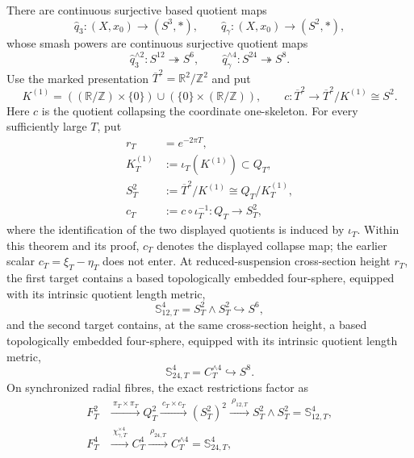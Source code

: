 \begin{theorem}
\label{cusp-cone-angle-forgotten-sphere-carriers}
There are continuous surjective based quotient maps
\[
 \widehat q_3:(X,x_0)\longrightarrow(S^3,*),
 \qquad
 \widehat q_\gamma:(X,x_0)\longrightarrow(S^2,*),
\]
whose smash powers are continuous surjective quotient maps
\begin{equation}
 \widehat q_3^{\wedge2}:S^{12}\twoheadrightarrow S^6,
 \qquad
 \widehat q_\gamma^{\wedge4}:S^{24}\twoheadrightarrow S^8.
 \label{cusp-cone-sphere-to-sphere-maps}
\end{equation}
Use the marked presentation \(\overline T^2=\mathbb R^2/\mathbb Z^2\) and
put
\[
 K^{(1)}
 =((\mathbb R/\mathbb Z)\times\{0\})
  \cup(\{0\}\times(\mathbb R/\mathbb Z)),
 \qquad
 c:\overline T^2\longrightarrow\overline T^2/K^{(1)}\cong S^2.
\]
Here \(c\) is the quotient collapsing the coordinate one-skeleton.  For
every sufficiently large \(T\), put
\begin{align*}
 r_T&=e^{-2\pi T},\\
 K_T^{(1)}&:=\iota_T(K^{(1)})\subset Q_T,\\
 S_T^2&:=\overline T^2/K^{(1)}\cong Q_T/K_T^{(1)},\\
 c_T&:=c\circ\iota_T^{-1}:Q_T\longrightarrow S_T^2,
\end{align*}
where the identification of the two displayed quotients is induced by
\(\iota_T\).  Within this theorem and its proof, \(c_T\) denotes the
displayed collapse map; the earlier scalar \(c_T=\xi_T-\eta_T\) does not
enter.
At reduced-suspension cross-section height \(r_T\), the first target contains
a based topologically embedded four-sphere, equipped with its intrinsic
quotient length metric,
\[
 \mathbb S_{12,T}^4=S_T^2\wedge S_T^2\hookrightarrow S^6,
\]
and the second target contains, at the same cross-section height, a based
topologically embedded four-sphere, equipped with its intrinsic quotient
length metric,
\[
 \mathbb S_{24,T}^4=C_T^{\wedge4}\hookrightarrow S^8.
\]
On synchronized radial fibres, the exact restrictions factor as
\begin{align}
 F_T^2&\xrightarrow{\ \pi_T\times\pi_T\ }
 Q_T^2\xrightarrow{\ c_T\times c_T\ }(S_T^2)^2
 \xrightarrow{\ \rho_{12,T}\ }S_T^2\wedge S_T^2
 =\mathbb S_{12,T}^4,
 \label{cusp-cone-S12-S4-radial-map}\\
 F_T^4&\xrightarrow{\ \chi_{\gamma,T}^{\times4}\ }
 C_T^4\xrightarrow{\ \rho_{24,T}\ }C_T^{\wedge4}
 =\mathbb S_{24,T}^4,
 \label{cusp-cone-S24-S4-radial-map}

\end{align}
\end{theorem}
